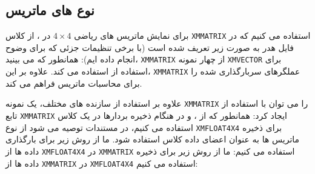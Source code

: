 \subsection{\textbf{نوع های ماتریس}}
{
    \Large
    \begin{spacing}{1.5}
        برای نمایش ماتریس های ریاضی $4\times 4$ در ، از کلاس \texttt{XMMATRIX} استفاده می کنیم که در فایل هدر  به صورت زیر تعریف شده است (با برخی تنظیمات جزئی که برای وضوح انجام داده ایم):
        \textbf{\vspace{6pt}}
        \lr{}
        \textbf{\vspace{6pt}}
        همانطور که می بینید، \texttt{XMMATRIX} از چهار نمونه \texttt{XMVECTOR} برای استفاده از  استفاده می کند. علاوه بر این، \texttt{XMMATRIX} عملگرهای سربارگذاری شده را برای محاسبات ماتریس فراهم می کند.

        علاوه بر استفاده از سازنده های مختلف، یک نمونه \texttt{XMMATRIX} را می توان با استفاده از تابع \texttt{XMMATRIX} ایجاد کرد:
        \textbf{\vspace{6pt}}
        \lr{}
        \textbf{\vspace{6pt}}
        همانطور که از ،  و  در هنگام ذخیره بردارها در یک کلاس استفاده می کنیم،
        در مستندات  توصیه می شود از نوع \texttt{XMFLOAT4X4} برای ذخیره ماتریس ها به عنوان اعضای داده کلاس استفاده شود.
        \textbf{\vspace{6pt}}
        \lr{}
        \textbf{\vspace{6pt}}
        ما از روش زیر برای بارگذاری داده ها از \texttt{XMFLOAT4X4} در \texttt{XMMATRIX} استفاده می کنیم:
        \textbf{\vspace{6pt}}
        \lr{}
        \textbf{\vspace{6pt}}
        ما از روش زیر برای ذخیره داده ها از \texttt{XMMATRIX} در \texttt{XMFLOAT4X4} استفاده می کنیم:
        \textbf{\vspace{6pt}}
        \lr{}
    \end{spacing}
}

\textbf{\vspace{-60pt}}
